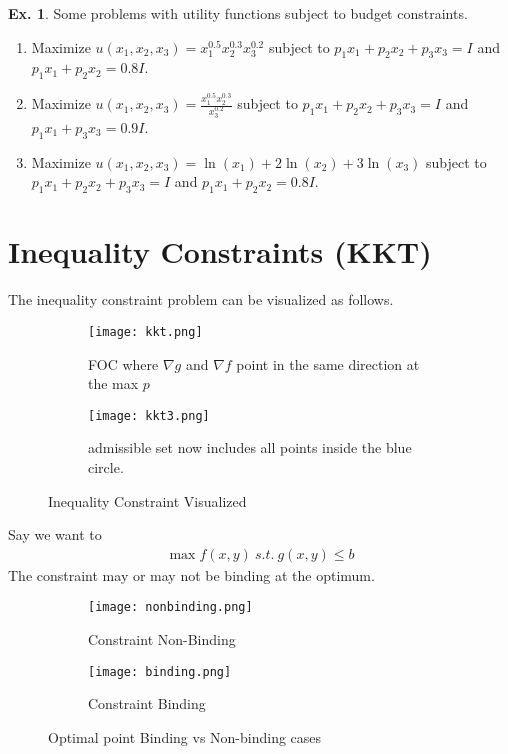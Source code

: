 \documentclass[10pt,a4paper]{book}
\theoremstyle{definition}\newtheorem{definition}{Definition}
\theoremstyle{definition}\newtheorem{fact}{Fact}
\theoremstyle{definition}\newtheorem{ex}{Ex.}
\theoremstyle{definition}\newtheorem{project}{Project}
\theoremstyle{definition}\newtheorem{problem}{Problem}
\theoremstyle{definition}\newtheorem{example}{Example}
\numberwithin{theorem}{chapter}
\numberwithin{corollary}{chapter}
\numberwithin{assumption}{chapter}
\numberwithin{definition}{chapter}
\numberwithin{prop}{chapter}
\numberwithin{notation}{chapter}
\numberwithin{problem}{chapter}
\numberwithin{example}{chapter}
\numberwithin{fact}{chapter}
\numberwithin{ex}{chapter}
\begin{document}
	\begin{ex}
		Some problems with utility functions subject to budget constraints.
		\begin{enumerate}[label=(\alph*)]
			\item Maximize $u(x_1,x_2,x_3)=x_1^{0.5}x_2^{0.3}x_3^{0.2}$ subject to $p_1x_1+p_2x_2+p_3x_3=I$ and $p_1x_1+p_2x_2 = 0.8I$.
			
			\item Maximize $u(x_1,x_2,x_3)=\frac{x_1^{0.5}x_2^{0.3}}{x_3^{0.2}}$ subject to $p_1x_1+p_2x_2+p_3x_3=I$ and $p_1x_1+p_3x_3 = 0.9I$.
			
			\item Maximize $u(x_1,x_2,x_3)=\ln(x_1)+2\ln(x_2)+3\ln(x_3)$ subject to $p_1x_1+p_2x_2+p_3x_3=I$ and $p_1x_1+p_2x_2 = 0.8I$.
		\end{enumerate}
	\end{ex}
	
	\section{Inequality Constraints (KKT)}
	
	The inequality constraint problem can be visualized as follows.
	\begin{figure}[H]
		\centering
		\begin{subfigure}[b]{0.4\linewidth}
			\texttt{[image: kkt.png]}
			\caption{FOC where $\nabla g$ and $\nabla f$ point in the same direction at the max $p$}
		\end{subfigure}
		\begin{subfigure}[b]{0.4\linewidth}
			\texttt{[image: kkt3.png]}
			\caption{admissible set now includes all points inside the blue circle.}
		\end{subfigure}
		\caption{Inequality Constraint Visualized}
		\label{fig:kkt}
	\end{figure}

	Say we want to
	\begin{align*}
		\max f(x,y) \ s.t. \ g(x,y) \leq b
	\end{align*}
	The constraint may or may not be binding at the optimum.
	\begin{figure}[h!]
		\centering
		\begin{subfigure}[b]{0.4\linewidth}
			\texttt{[image: nonbinding.png]}
			\caption{Constraint Non-Binding}
		\end{subfigure}
		\begin{subfigure}[b]{0.5\linewidth}
			\texttt{[image: binding.png]}
			\caption{Constraint Binding}
		\end{subfigure}
		\caption{Optimal point Binding vs Non-binding cases}
		\label{fig:kkt_bind}
	\end{figure}
	
\end{document}
